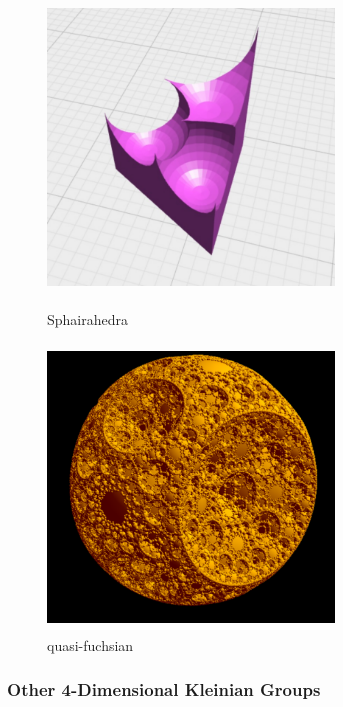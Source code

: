 \begin{figure}[htbp]
 \begin{minipage}{0.49\hsize}
  \begin{center}
   \includegraphics[width=3in, height=3in, keepaspectratio]{../img/klein/sphairahedra.pdf}
   \caption{Sphairahedra}
   \label{fig:sphairahedra}
  \end{center}
 \end{minipage}
 \begin{minipage}{0.49\hsize}
  \begin{center}
   \includegraphics[width=3in, height=3in, keepaspectratio]{../img/klein/quasi-fuchsian.pdf}
   \caption{quasi-fuchsian}
   \label{fig:quasiFuchsian}
  \end{center}
 \end{minipage}
\end{figure}

\subsubsection{Other 4-Dimensional Kleinian Groups}

